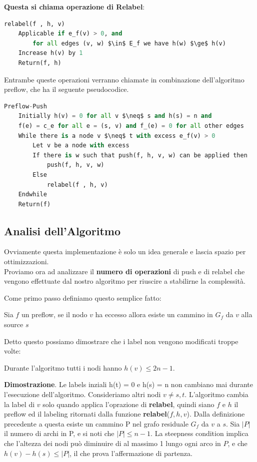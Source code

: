 \textbf{Questa si chiama operazione di Relabel}:
\begin{lstlisting}[language=Python, mathescape=true]
relabel(f , h, v)
    Applicable if e_f(v) > 0, and
        for all edges (v, w) $\in$ E_f we have h(w) $\ge$ h(v)
    Increase h(v) by 1
    Return(f, h)
\end{lstlisting}

Entrambe queste operazioni verranno chiamate in combinazione dell'algoritmo preflow, che ha il seguente pseudocodice.

\begin{lstlisting}[language=Python, mathescape=true]
Preflow-Push
    Initially h(v) = 0 for all v $\neq$ s and h(s) = n and
    f(e) = c_e for all e = (s, v) and f_(e) = 0 for all other edges
    While there is a node v $\neq$ t with excess e_f(v) > 0
        Let v be a node with excess
        If there is w such that push(f, h, v, w) can be applied then
            push(f, h, v, w)
        Else
            relabel(f , h, v)
    Endwhile
    Return(f)
\end{lstlisting}

\subsection{Analisi dell'Algoritmo}
Ovviamente questa implementazione è solo un idea generale e lascia spazio per ottimizzazioni.\\

Proviamo ora ad analizzare il \textbf{numero di operazioni} di push e di relabel che vengono effettuate dal nostro algoritmo per riuscire a stabilirne la complessità.

Come primo passo definiamo questo semplice fatto:
\begin{myblockquote}
	Sia $f$ un preflow, se il nodo $v$ ha eccesso allora esiste un cammino in $G_f$ da $v$ alla source $s$
\end{myblockquote}

Detto questo possiamo dimostrare che i label non vengono modificati troppe volte:
\begin{myblockquote}
	Durante l'algoritmo tutti i nodi hanno $h(v) \le 2n-1$.
\end{myblockquote}

\textbf{Dimostrazione}. Le labels inziali h(t) = 0 e h(s) = n non cambiano mai durante
l'esecuzione dell'algoritmo. Consideriamo altri nodi $v \neq s, t$. L'algoritmo cambia la
label di $v$ solo quando applica l'oprazione di \textbf{relabel}, quindi siano $f$ e $h$ il
preflow ed il labeling ritornati dalla funzione \textbf{relabel}($f , h, v$). Dalla
definizione precedente a questa esiste un cammino P nel grafo residuale $G_f$ da $v$ a $s$.
Sia $|P|$ il numero di archi in P, e si noti che $|P| \leq n - 1$. La steepness condition
implica che l'altezza dei nodi può diminuire di al massimo 1 lungo ogni arco in $P$, e che
$h(v) - h(s) \leq |P|$, il che prova l'affermazione di partenza.\\

